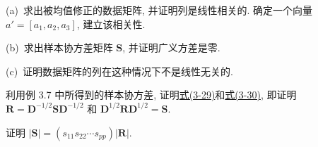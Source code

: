 (a)\ 求出被均值修正的数据矩阵, 并证明列是线性相关的. 确定一个向量 $a'=[a_1,a_2,a_3]$, 建立该相关性.

(b)\ 求出样本协方差矩阵 $\mathbf{S}$, 并证明广义方差是零.

(c)\ 证明数据矩阵的列在这种情况下不是线性无关的.

\quad 利用例 3.7 中所得到的样本协方差, 证明\hyperref[eq:3-29]{式(3-29)}和\hyperref[eq:3-30]{式(3-30)}, 即证明 $\mathbf{R}=\mathbf{D}^{-1/2}\mathbf{S}\mathbf{D}^{-1/2}$ 和 $\mathbf{D}^{1/2}\mathbf{R}\mathbf{D}^{1/2}=\mathbf{S}$.

\quad 证明 $|\mathbf{S}|=(s_{11}s_{22}\cdots s_{pp})|\mathbf{R}|$.

